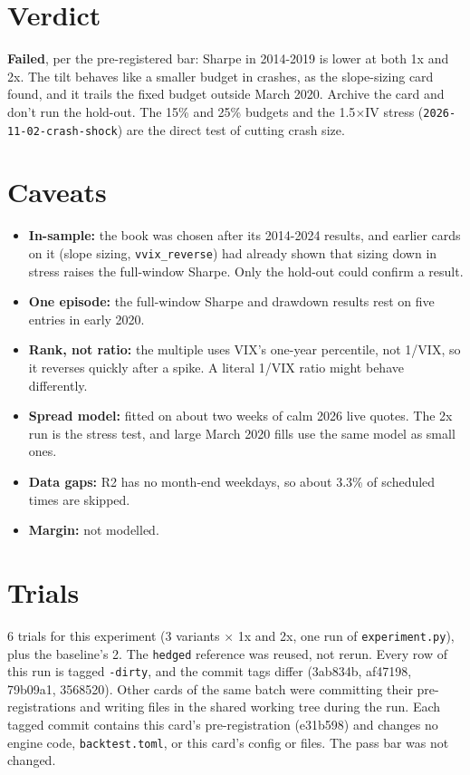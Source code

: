 \documentclass{article}
\begin{document}
\section{Verdict}

\textbf{Failed}, per the pre-registered bar: Sharpe in 2014-2019 is lower at both 1x and 2x. The tilt behaves like a smaller budget in crashes, as the slope-sizing card found, and it trails the fixed budget outside March 2020. Archive the card and don't run the hold-out. The 15\% and 25\% budgets and the 1.5\ensuremath{\times}IV stress (\texttt{2026-\allowbreak{}11-\allowbreak{}02-\allowbreak{}crash-\allowbreak{}shock}) are the direct test of cutting crash size.

\section{Caveats}

\begin{itemize}

\item \textbf{In-sample:} the book was chosen after its 2014-2024 results, and earlier cards on it (slope sizing, \texttt{vvix\_\allowbreak{}reverse}) had already shown that sizing down in stress raises the full-window Sharpe. Only the hold-out could confirm a result.

\item \textbf{One episode:} the full-window Sharpe and drawdown results rest on five entries in early 2020.

\item \textbf{Rank, not ratio:} the multiple uses VIX's one-year percentile, not 1/\allowbreak{}VIX, so it reverses quickly after a spike. A literal 1/\allowbreak{}VIX ratio might behave differently.

\item \textbf{Spread model:} fitted on about two weeks of calm 2026 live quotes. The 2x run is the stress test, and large March 2020 fills use the same model as small ones.

\item \textbf{Data gaps:} R2 has no month-end weekdays, so about 3.3\% of scheduled times are skipped.

\item \textbf{Margin:} not modelled.

\end{itemize}

\section{Trials}

6 trials for this experiment (3 variants \ensuremath{\times} 1x and 2x, one run of \texttt{experiment.\allowbreak{}py}), plus the baseline's 2. The \texttt{hedged} reference was reused, not rerun. Every row of this run is tagged \texttt{-\allowbreak{}dirty}, and the commit tags differ (3ab834b, af47198, 79b09a1, 3568520). Other cards of the same batch were committing their pre-registrations and writing files in the shared working tree during the run. Each tagged commit contains this card's pre-registration (e31b598) and changes no engine code, \texttt{backtest.\allowbreak{}toml}, or this card's config or files. The pass bar was not changed.
\end{document}
